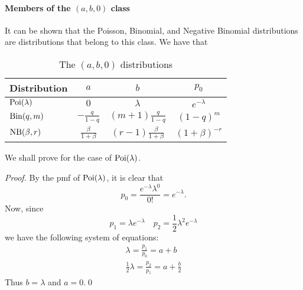 \documentclass[notoc,notitlepage]{tufte-book}
\begin{document}
\paragraph{Members of the $(a, b, 0)$ class} It can be shown that the Poisson, Binomial, and Negative Binomial distributions are  distributions that belong to this class. We have that

\begin{table}[ht]
  \centering
  \begin{tabular}{l | c | c | c}
    \toprule
    Distribution    & $a$                       & $b$                              & $p_0$ \\
    \midrule
    $\operatorname{Poi}(\lambda)$ & $0$                       & $\lambda$                        & $e^{-\lambda}$ \\
    $\operatorname{Bin}(q, m)$    & $-\frac{q}{1 - q}$        & $( m + 1 ) \frac{q}{1 - q}$      & $(1 - q)^m$ \\
    $\operatorname{NB}(\beta, r)$ & $\frac{\beta}{1 + \beta}$ & $(r - 1)\frac{\beta}{1 + \beta}$ & $(1 + \beta)^{-r}$ \\
    \bottomrule
  \end{tabular}
  \caption{The $(a, b, 0)$ distributions}
  \label{table:the_a_b_0_distributions}
\end{table}

We shall prove for the case of $\operatorname{Poi}(\lambda)$.

\begin{proof}
  By the pmf of $\operatorname{Poi}(\lambda)$, it is clear that
  \begin{equation*}
    p_0 = \frac{e^{-\lambda} \lambda^0}{0!} = e^{-\lambda}.
  \end{equation*}
  Now, since
  \begin{equation*}
    p_1 = \lambda e^{-\lambda} \quad p_2 = \frac{1}{2} \lambda^2 e^{-\lambda}
  \end{equation*}
  we have the following system of equations:
  \begin{gather*}
    \lambda = \frac{p_1}{p_0} = a + b \\
    \frac{1}{2}\lambda = \frac{p_2}{p_1} = a + \frac{b}{2}
  \end{gather*}
  Thus $b = \lambda$ and $a = 0$.\qed\
\end{proof}
\end{document}
